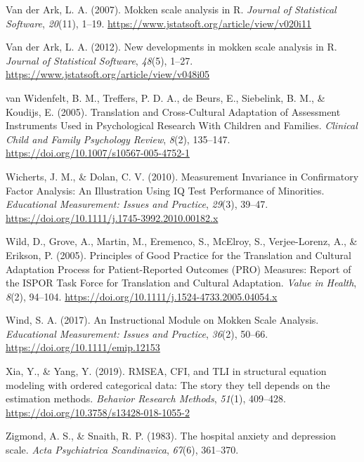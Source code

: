 \documentclass[
  ,doc,11pt, twoside,floatsintext]{apa6}
\newlength{\cslhangindent}
\newlength{\cslentryspacingunit} %
\newenvironment{CSLReferences}[2] %
 {%
  \setlength{\parindent}{0pt}
  \ifodd #1
  \let\oldpar\par
  \def\par{\hangindent=\cslhangindent\oldpar}
  \fi
  \setlength{\parskip}{#2\cslentryspacingunit}
 }%
 {}
\begin{document}
\begin{CSLReferences}{1}{0}
\leavevmode{}%
Van der Ark, L. A. (2007). Mokken scale analysis in {R}. \emph{Journal of Statistical Software}, \emph{20}(11), 1--19. \url{https://www.jstatsoft.org/article/view/v020i11}

\leavevmode{}%
Van der Ark, L. A. (2012). New developments in mokken scale analysis in {R}. \emph{Journal of Statistical Software}, \emph{48}(5), 1--27. \url{https://www.jstatsoft.org/article/view/v048i05}

\leavevmode{}%
van Widenfelt, B. M., Treffers, P. D. A., de Beurs, E., Siebelink, B. M., \& Koudijs, E. (2005). Translation and {Cross-Cultural Adaptation} of {Assessment Instruments Used} in {Psychological Research With Children} and {Families}. \emph{Clinical Child and Family Psychology Review}, \emph{8}(2), 135--147. \url{https://doi.org/10.1007/s10567-005-4752-1}

\leavevmode{}%
Wicherts, J. M., \& Dolan, C. V. (2010). Measurement {Invariance} in {Confirmatory Factor Analysis}: {An Illustration Using IQ Test Performance} of {Minorities}. \emph{Educational Measurement: Issues and Practice}, \emph{29}(3), 39--47. \url{https://doi.org/10.1111/j.1745-3992.2010.00182.x}

\leavevmode{}%
Wild, D., Grove, A., Martin, M., Eremenco, S., McElroy, S., Verjee-Lorenz, A., \& Erikson, P. (2005). Principles of {Good Practice} for the {Translation} and {Cultural Adaptation Process} for {Patient-Reported Outcomes} ({PRO}) {Measures}: {Report} of the {ISPOR Task Force} for {Translation} and {Cultural Adaptation}. \emph{Value in Health}, \emph{8}(2), 94--104. \url{https://doi.org/10.1111/j.1524-4733.2005.04054.x}

\leavevmode{}%
Wind, S. A. (2017). An {Instructional Module} on {Mokken Scale Analysis}. \emph{Educational Measurement: Issues and Practice}, \emph{36}(2), 50--66. \url{https://doi.org/10.1111/emip.12153}

\leavevmode{}%
Xia, Y., \& Yang, Y. (2019). {RMSEA}, {CFI}, and {TLI} in structural equation modeling with ordered categorical data: {The} story they tell depends on the estimation methods. \emph{Behavior Research Methods}, \emph{51}(1), 409--428. \url{https://doi.org/10.3758/s13428-018-1055-2}

\leavevmode{}%
Zigmond, A. S., \& Snaith, R. P. (1983). The hospital anxiety and depression scale. \emph{Acta Psychiatrica Scandinavica}, \emph{67}(6), 361--370.

\end{CSLReferences}
\end{document}
